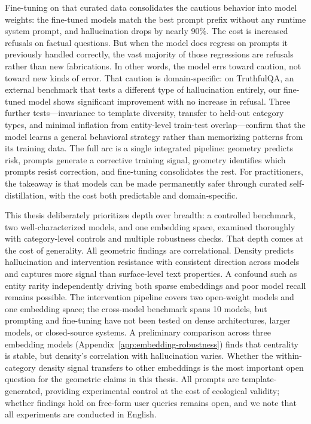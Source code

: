 Fine-tuning on that curated data consolidates the cautious behavior into model weights: the fine-tuned models match the best prompt prefix without any runtime system prompt, and hallucination drops by nearly 90\%. The cost is increased refusals on factual questions. But when the model does regress on prompts it previously handled correctly, the vast majority of those regressions are refusals rather than new fabrications. In other words, the model errs toward caution, not toward new kinds of error. That caution is domain-specific: on TruthfulQA, an external benchmark that tests a different type of hallucination entirely, our fine-tuned model shows significant improvement with no increase in refusal. Three further tests---invariance to template diversity, transfer to held-out category types, and minimal inflation from entity-level train-test overlap---confirm that the model learns a general behavioral strategy rather than memorizing patterns from its training data. The full arc is a single integrated pipeline: geometry predicts risk, prompts generate a corrective training signal, geometry identifies which prompts resist correction, and fine-tuning consolidates the rest. For practitioners, the takeaway is that models can be made permanently safer through curated self-distillation, with the cost both predictable and domain-specific.

This thesis deliberately prioritizes depth over breadth: a controlled benchmark, two well-characterized models, and one embedding space, examined thoroughly with category-level controls and multiple robustness checks. That depth comes at the cost of generality. All geometric findings are correlational. Density predicts hallucination and intervention resistance with consistent direction across models and captures more signal than surface-level text properties. A confound such as entity rarity independently driving both sparse embeddings and poor model recall remains possible. The intervention pipeline covers two open-weight models and one embedding space; the cross-model benchmark spans 10 models, but prompting and fine-tuning have not been tested on dense architectures, larger models, or closed-source systems. A preliminary comparison across three embedding models (Appendix~\ref{app:embedding-robustness}) finds that centrality is stable, but density's correlation with hallucination varies. Whether the within-category density signal transfers to other embeddings is the most important open question for the geometric claims in this thesis. All prompts are template-generated, providing experimental control at the cost of ecological validity; whether findings hold on free-form user queries remains open, and we note that all experiments are conducted in English. 

